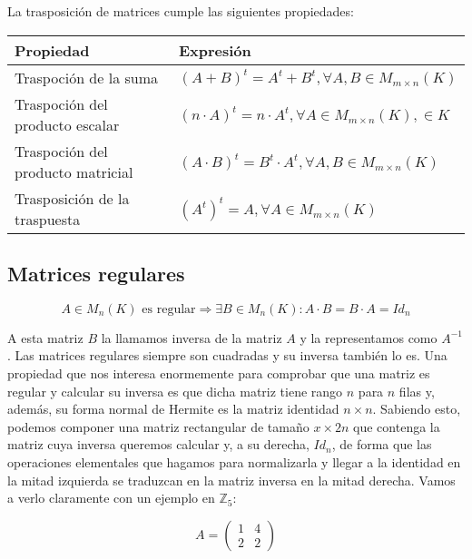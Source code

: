 La trasposición de matrices cumple las siguientes propiedades:

\begin{center}
\begin{tabular}{l l}
	\textbf{Propiedad}                & \textbf{Expresión}                                                      \\
	\toprule
	Traspoción de la suma             & ${(A+B)}^t = A^t + B^t , \forall A,B \in M_{m \times n}(K)$             \\
	Traspoción del producto escalar   & ${(n \cdot A)}^t = n \cdot A^t, \forall A \in M_{m \times n}(K), \in K$ \\
	Traspoción del producto matricial & ${(A \cdot B)}^t = B^t \cdot A^t, \forall A,B \in M_{m \times n}(K)$    \\
	Trasposición de la traspuesta     & ${(A^t)}^t = A, \forall A \in M_{m \times n}(K)$                        \\
\end{tabular}
\end{center}

\subsection{Matrices regulares}\label{matrices-regulares}

\[A \in M_n(K) \text{ es regular} \Rightarrow \exists B \in M_n(K) : A \cdot B = B \cdot A = Id_n\]

A esta matriz $B$ la llamamos inversa de la matriz $A$ y la representamos como $A^{-1}$.
Las matrices regulares siempre son cuadradas y su inversa también lo es.
Una propiedad que nos interesa enormemente para comprobar que una matriz es regular y calcular su inversa es que dicha matriz tiene rango $n$ para $n$ filas y, además, su forma normal de Hermite es la matriz identidad $n \times n$.
Sabiendo esto, podemos componer una matriz rectangular de tamaño $x \times 2n$ que contenga la matriz cuya inversa queremos calcular y, a su derecha, $Id_n$, de forma que las operaciones elementales que hagamos para normalizarla y llegar a la identidad en la mitad izquierda se traduzcan en la matriz inversa en la mitad derecha.
Vamos a verlo claramente con un ejemplo en $\mathbb{Z}_5$:

\[
	A =
	\begin{pmatrix}
		1 & 4 \\
		2 & 2
	\end{pmatrix}
\]


